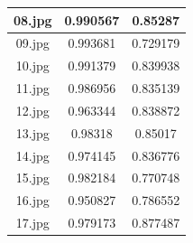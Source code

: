 \begin{table}[h!]
\begin{tabular}{ccc}
    \multicolumn{1}{|c|}{08.jpg}                                                      & \multicolumn{1}{c|}{0.990567}                                                     & \multicolumn{1}{c|}{0.85287}                       \\ \hline
    \multicolumn{1}{|c|}{09.jpg}                                                      & \multicolumn{1}{c|}{0.993681}                                                     & \multicolumn{1}{c|}{0.729179}                       \\ \hline
    \multicolumn{1}{|c|}{10.jpg}                                                      & \multicolumn{1}{c|}{0.991379}                                                     & \multicolumn{1}{c|}{0.839938}                       \\ \hline
    \multicolumn{1}{|c|}{11.jpg}                                                      & \multicolumn{1}{c|}{0.986956}                                                     & \multicolumn{1}{c|}{0.835139}                       \\ \hline
    \multicolumn{1}{|c|}{12.jpg}                                                      & \multicolumn{1}{c|}{0.963344}                                                     & \multicolumn{1}{c|}{0.838872}                       \\ \hline
    \multicolumn{1}{|c|}{13.jpg}                                                      & \multicolumn{1}{c|}{0.98318}                                                     & \multicolumn{1}{c|}{0.85017}                       \\ \hline
    \multicolumn{1}{|c|}{14.jpg}                                                      & \multicolumn{1}{c|}{0.974145}                                                     & \multicolumn{1}{c|}{0.836776}                       \\ \hline
    \multicolumn{1}{|c|}{15.jpg}                                                      & \multicolumn{1}{c|}{0.982184}                                                     & \multicolumn{1}{c|}{0.770748}                       \\ \hline
    \multicolumn{1}{|c|}{16.jpg}                                                      & \multicolumn{1}{c|}{0.950827}                                                     & \multicolumn{1}{c|}{0.786552}                       \\ \hline
    \multicolumn{1}{|c|}{17.jpg}                                                      & \multicolumn{1}{c|}{0.979173}                                                     & \multicolumn{1}{c|}{0.877487}                       \\ \hline

\end{tabular}
\end{table}
